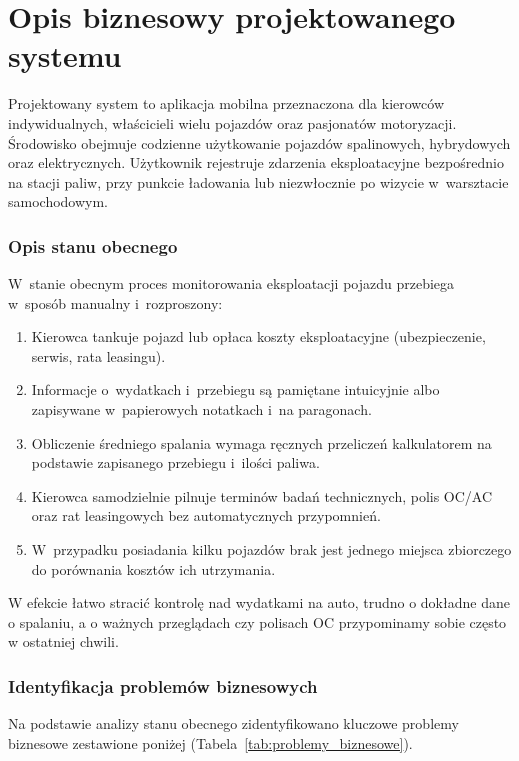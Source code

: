 ﻿\chapter{Opis biznesowy projektowanego systemu}
\label{cha:analiza_wymagan}
Projektowany system to aplikacja mobilna przeznaczona dla kierowców indywidualnych, właścicieli wielu pojazdów oraz pasjonatów motoryzacji. Środowisko obejmuje codzienne użytkowanie pojazdów spalinowych, hybrydowych oraz elektrycznych. Użytkownik rejestruje zdarzenia eksploatacyjne bezpośrednio na stacji paliw, przy punkcie ładowania lub niezwłocznie po wizycie w~warsztacie samochodowym.


\subsection{Opis stanu obecnego}
\label{subsec:stan_obecny}

W~stanie obecnym proces monitorowania eksploatacji pojazdu przebiega w~sposób manualny i~rozproszony:
\begin{enumerate}
    \item Kierowca tankuje pojazd lub opłaca koszty eksploatacyjne (ubezpieczenie, serwis, rata leasingu).
    \item Informacje o~wydatkach i~przebiegu są pamiętane intuicyjnie albo zapisywane w~papierowych notatkach i~na paragonach.
    \item Obliczenie średniego spalania wymaga ręcznych przeliczeń kalkulatorem na podstawie zapisanego przebiegu i~ilości paliwa.
    \item Kierowca samodzielnie pilnuje terminów badań technicznych, polis OC/AC oraz rat leasingowych bez automatycznych przypomnień.
    \item W~przypadku posiadania kilku pojazdów brak jest jednego miejsca zbiorczego do porównania kosztów ich utrzymania.
\end{enumerate}

W efekcie łatwo stracić kontrolę nad wydatkami na auto, trudno o dokładne dane o spalaniu, a o ważnych przeglądach czy polisach OC przypominamy sobie często w ostatniej chwili.

\subsection{Identyfikacja problemów biznesowych}
\label{subsec:problemy_biznesowe}

Na podstawie analizy stanu obecnego zidentyfikowano kluczowe problemy biznesowe zestawione poniżej (Tabela~\ref{tab:problemy_biznesowe}).

